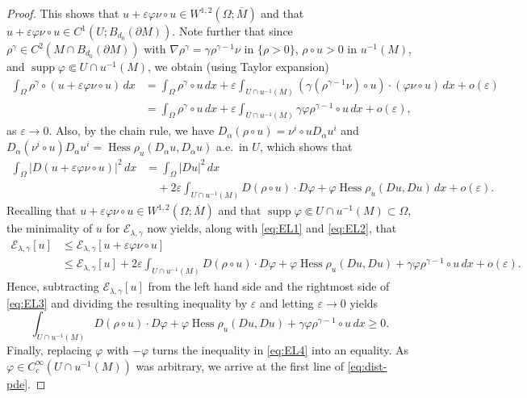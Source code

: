 \documentclass[10pt,a4paper]{amsart}
\newcommand{\Hess}{\operatorname{Hess}}
\newcommand{\cE}{{\mathcal E}}
\newcommand{\e}{\varepsilon}
\newcommand{\supp}{\operatorname{supp}}
\newcommand{\vp}{\varphi}
\begin{document}
\begin{proof}
This shows that $u + \e\vp\nu\circ u \in W^{1,2}(\Omega;\overline M)$ and that $u + \e\vp\nu\circ u\in C^1(U;B_{d_0}(\partial M))$. Note further that since $\rho^\gamma \in C^2(M\cap B_{d_0}(\partial M))$ with $\nabla\rho^\gamma = \gamma \rho^{\gamma-1}\nu$ in $\{\rho > 0\}$, $\rho\circ u > 0$ in $u^{-1}(M)$, and $\supp\vp \Subset U\cap u^{-1}(M)$, we obtain  (using Taylor expansion)
\begin{equation}
    \label{eq:EL1}
    \begin{aligned}
        \int_\Omega \rho^\gamma\circ (u + \e \vp\nu\circ u)\,dx &= \int_\Omega \rho^\gamma\circ u \,dx  + \e \int_{U\cap u^{-1}(M)} \left(\gamma (\rho^{\gamma-1}\nu)\circ u\right)\cdot \left(\varphi \nu\circ u\right)\,dx + o(\e) \\
        &= \int_\Omega \rho^\gamma\circ u \,dx  + \e \int_{U\cap u^{-1}(M)} \gamma \varphi\rho^{\gamma-1}\circ u\,dx + o(\e),
    \end{aligned}
\end{equation}
as $\e \to 0$. Also, by the chain rule, we have $D_\alpha(\rho\circ u) = \nu^i\circ u D_\alpha u^i$ and $D_\alpha (\nu^i\circ u)D_\alpha u^i = \Hess\rho_u(D_\alpha u,D_\alpha u)$ a.e.\ in $U$, which shows that 
\begin{equation}
    \label{eq:EL2}
    \begin{aligned}
        \int_\Omega |D ( u + \e \vp\nu\circ u)|^2 \,dx &= \int_\Omega |Du|^2 \,dx \\
        &\quad + 2\e \int_{U\cap u^{-1}(M)} D(\rho\circ u)\cdot D\vp + \vp \Hess\rho_u(Du,Du)\,dx + o(\e). 
    \end{aligned}
\end{equation}
Recalling that $u + \e \vp\nu\circ u \in W^{1,2}(\Omega;\overline M)$ and that $\supp \vp \Subset U\cap u^{-1}(M)\subset\Omega$, the minimality of $u$ for $\cE_{\lambda,\gamma}$ now yields, along with \eqref{eq:EL1} and \eqref{eq:EL2}, that 
\begin{equation}
    \label{eq:EL3}
    \begin{aligned}
        \cE_{\lambda,\gamma}[u] &\leq \cE_{\lambda,\gamma}[u + \e\vp\nu\circ u] \\
        & \leq \cE_{\lambda,\gamma}[u] + 2 \e \int_{U\cap u^{-1}(M)} D(\rho\circ u)\cdot D\vp + \vp \Hess\rho_u(Du,Du) + \gamma \varphi \rho^{\gamma-1}\circ u\,dx + o(\e).
    \end{aligned}
\end{equation}
Hence, subtracting $\cE_{\lambda,\gamma}[u]$ from the left hand side and the rightmost side of \eqref{eq:EL3} and dividing the resulting inequality by $\e$ and letting $\e\to 0$ yields 
\begin{equation}
    \label{eq:EL4}
    \int_{U\cap u^{-1}(M)} D(\rho\circ u)\cdot D\vp + \vp \Hess\rho_u(Du,Du) + \gamma \varphi  \rho^{\gamma-1}\circ u\,dx \geq 0. 
\end{equation}
Finally, replacing $\vp$ with $-\vp$ turns the inequality in \eqref{eq:EL4} into an equality. As $\vp\in C_c^\infty(U\cap u^{-1}(M))$ was arbitrary, we arrive at the first line of \eqref{eq:dist-pde}. 



\end{proof}
\end{document}
